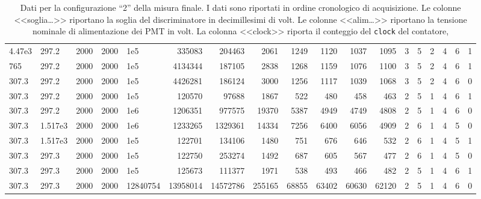 \begin{landscape}
\begin{table}[p]
\begin{tabular}{llll|lrrrrrrr|ccccc|c}
			4.47e3 & 297.2 & 2000 & 2000 & 1e5 & 335083 & 204463 & 2061 & 1249 & 1120 & 1037 & 1095 & 3 & 5 & 2 & 4 & 6 & 1    \\   %
			765 & 297.2 & 2000 & 2000 & 1e5 & 4134344 & 187105 & 2838 & 1268 & 1159 & 1076 & 1100 & 3 & 5 & 2 & 4 & 6 & 1      \\   %
			307.3 & 297.2 & 2000 & 2000 & 1e5 & 4426281 & 186124 & 3000 & 1256 & 1117 & 1039 & 1068 & 3 & 5 & 2 & 4 & 6 & 0     \\  %
			\hline
			307.3 & 297.2 & 2000 & 2000 & 1e5 & 120570 & 97688 & 1867 & 522 & 480 & 458 & 463 & 2 & 5 & 1 & 4 & 6 & 1                             \\
			307.3 & 297.2 & 2000 & 2000 & 1e6 & 1206351 & 977575 & 19370 & 5387 & 4949 & 4749 & 4808 & 2 & 5 & 1 & 4 & 6 & 0                      \\
			\hline
			307.3 & 1.517e3 & 2000 & 2000 & 1e6 & 1233265 & 1329361 & 14334 & 7256 & 6400 & 6056 & 4909 & 2 & 6 & 1 & 4 & 5 & 0                   \\
			307.3 & 1.517e3 & 2000 & 2000 & 1e5 & 122701 & 134106 & 1480 & 751 & 676 & 646 & 532 & 2 & 6 & 1 & 4 & 5 & 1                          \\
			307.3 & 297.3 & 2000 & 2000 & 1e5 & 122750 & 253274 & 1492 & 687 & 605 & 567 & 477 & 2 & 6 & 1 & 4 & 5 & 0                            \\
			\hline
			307.3 & 297.3 & 2000 & 2000 & 1e5 & 125673 & 111377 & 1971 & 538 & 493 & 466 & 482 & 2 & 5 & 1 & 4 & 6 & 1                            \\
			307.3 & 297.3 & 2000 & 2000 & 12840754 & 13958014 & 14572786 & 255165 & 68855 & 63402 & 60630 & 62120 & 2 & 5 & 1 & 4 & 6 & 0         
		\end{tabular}
		\caption{\label{tab:data2}
		Dati per la configurazione ``2'' della misura finale.
		I dati sono riportati in ordine cronologico di acquisizione.
		Le colonne <<soglia\dots>> riportano la soglia del discriminatore in decimillesimi di volt.
		Le colonne <<alim\dots>> riportano la tensione nominale di alimentazione dei PMT in volt.
		La colonna <<clock>> riporta il conteggio del \texttt{clock} del contatore,
}
\end{table}
\end{landscape}
